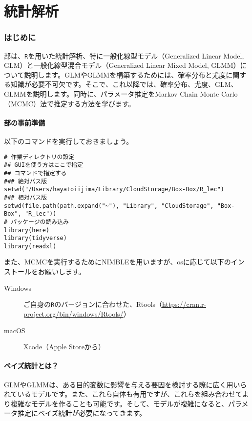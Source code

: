 \part{統計解析}
\label{statglm}
\section{はじめに}
\ref{statglm}部は、\verb|R|を用いた統計解析、特に一般化線型モデル（Generalized Linear Model, GLM）と一般化線型混合モデル（Generalized Linear Mixed Model, GLMM）について説明します。GLMやGLMMを構築するためには、確率分布と尤度に関する知識が必要不可欠です。そこで、これ以降では、確率分布、尤度、GLM、GLMMを説明します。同時に、パラメータ推定をMarkov Chain Monte Carlo（MCMC）法で推定する方法を学びます。

  \subsection{\ref{statglm}部の事前準備}
以下のコマンドを実行しておきましょう。
\begin{verbatim}
# 作業ディレクトリの設定
## GUIを使う方はここで指定
## コマンドで指定する
### 絶対パス版
setwd("/Users/hayatoiijima/Library/CloudStorage/Box-Box/R_lec")
### 相対パス版
setwd(file.path(path.expand("~"), "Library", "CloudStorage", "Box-Box", "R_lec"))
# パッケージの読み込み
library(here)
library(tidyverse)
library(readxl)
\end{verbatim}

また、MCMCを実行するためにNIMBLEを用いますが、osに応じて以下のインストールをお願いします。
\begin{description}
  \item[Windows]ご自身の\texttt{R}のバージョンに合わせた、Rtools（\url{https://cran.r-project.org/bin/windows/Rtools/}）
  \item[macOS]Xcode（Apple Storeから）
\end{description}

  \subsection{ベイズ統計とは？}
GLMやGLMMは、ある目的変数に影響を与える要因を検討する際に広く用いられているモデルです。また、これら自体も有用ですが、これらを組み合わせてより複雑なモデルを作ることも可能です。そして、モデルが複雑になると、パラメータ推定にベイズ統計が必要になってきます。

